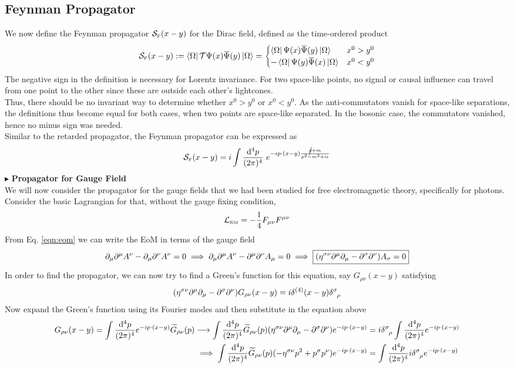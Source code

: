 \subsection{Feynman Propagator}
We now define the Feynman propagator $\mathcal S_{\text{\tiny F}}(x-y)$ for the Dirac field, defined as the time-ordered product 
$$\Ss\tund{F}(x-y) := \vacb \ST \Psi(x)\dadj{\Psi}(y)\vac = \begin{cases}
   \vacb \Psi(x)\dadj{\Psi}(y) \vac & x^0 > y^0\\ 
-\vacb \Psi(y)\dadj{\Psi}(x)\vac & x^0<y^0
\end{cases}$$
The negative sign in the definition is necessary for Lorentz invariance. For two space-like points, no signal or causal influence can travel from one point to the other since these are outside each other's lightcones.\\[0.2cm] Thus, there should be no invariant way to determine whether $x^0>y^0$ or $x^0<y^0$. As the anti-commutators vanish for space-like separations, the definitions thus become equal for both cases, when two points are space-like separated. In the bosonic case, the commutators vanished, hence no minus sign was needed. \\[0.2cm]
Similar to the retarded propagator, the Feynman propagator can be expressed as 
$$\mathcal S_{\text{\tiny F}}(x-y) =i \int \frac{\dd^4 p}{(2\pi)^4}\ e^{-i p\cdot (x-y) \frac{\cancel{p}+m}{p^2-m^2 + i\epsilon}}$$%
$\blacktriangleright$ \textbf{\large Propagator for Gauge Field}\\[0.2cm]
We will now consider the propagator for the gauge fields that we had been studied for free electromagnetic theory, specifically for photons. Consider the basic Lagrangian for that, without the gauge fixing condition, 
$$\mathcal L_{\text{\tiny EM}} = -\frac{1}{4}F_{\mu\nu}F^{\mu\nu}$$
From Eq. \ref{eqn:eom} we can write the EoM in terms of the gauge field
$$\partial_\mu \partial^\mu A^\nu -  \partial_\mu \partial^\nu A^\nu = 0 \implies \partial_\mu \partial^\mu A^\nu -  \partial^\mu \partial^\nu A_\mu = 0\implies \boxed{\qty(\eta^{\sigma\nu}\partial^\mu \partial_\mu  -  \partial^\sigma \partial^\nu) A_\sigma = 0}$$
In order to find the propagator, we can now try to find a Green's function for this equation, say $G_{\rho\nu}(x-y)$ satisfying 
$$\qty(\eta^{\sigma\nu}\partial^\mu \partial_\mu  -  \partial^\sigma \partial^\nu) G_{\rho\nu}(x-y) = i \delta^{(4)}(x-y) \delt{\sigma}{\rho}$$
Now expand the Green's function using its Fourier modes and then substitute in the equation above
\begin{align*}
    G_{\rho\nu}(x-y) = \int \frac{\dd^4 p}{(2\pi)^4} e^{-ip\cdot (x-y)} \widetilde{G}_{\rho\nu}(p)\longrightarrow \int \frac{\dd^4 p}{(2\pi)^4}\widetilde{G}_{\rho\nu}(p) \qty(\eta^{\sigma\nu}\partial^\mu \partial_\mu  -  \partial^\sigma \partial^\nu) e^{-ip\cdot (x-y)} &= i  \delt{\sigma}{\rho} \int  \frac{\dd^4 p}{(2\pi)^4} e^{-ip\cdot (x-y)}\\
    \implies \int \frac{\dd^4 p}{(2\pi)^4}\widetilde{G}_{\rho\nu}(p) (-\eta^{\sigma\nu} p^2 + p^\sigma p^\nu)e^{-ip\cdot (x-y)} &=  \int  \frac{\dd^4 p}{(2\pi)^4}  i  \delt{\sigma}{\rho} e^{-ip\cdot (x-y)}
\end{align*}
